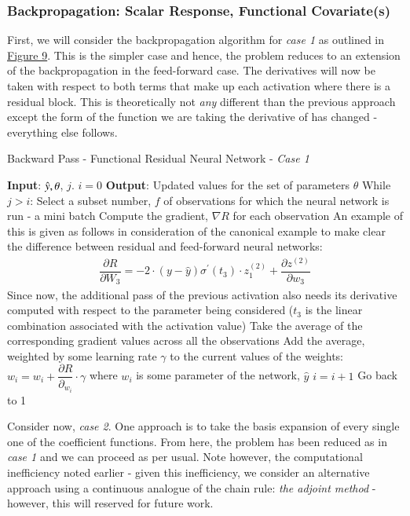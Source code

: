 \documentclass{article}
\begin{document}
\subsubsection{Backpropagation: Scalar Response, Functional Covariate(s)}
\label{sec:backpropResFuncNN}

\noindent First, we will consider the backpropagation algorithm for \textit{case 1} as outlined in \hyperref[fig:flowChartFuncResNN]{Figure 9}. This is the simpler case and hence, the problem reduces to an extension of the backpropagation in the feed-forward case. The derivatives will now be taken with respect to both terms that make up each activation where there is a residual block. This is theoretically not \textit{any} different than the previous approach except the form of the function we are taking the derivative of has changed - everything else follows.
\begin{algorithm}[H]
\caption{Backward Pass - Functional Residual Neural Network - \textit{Case 1}}\label{alg:backwardfuncnnRes}
\begin{algorithmic}[1]
\Statex \textbf{Input}: $\Hat{y}, \theta$, $j$. $i = 0$
\Statex \textbf{Output}: Updated values for the set of parameters $\theta$
\State While $j > i$:
\State Select a subset number, $f$ of observations for which the neural network is run - a mini batch
\State Compute the gradient, $\nabla R$ for each observation
\Statex An example of this is given as follows in consideration of the canonical example to make clear the difference between residual and feed-forward neural networks:
\begin{align}
    \dfrac{\partial R}{\partial W_{3}} = -2\cdot(y - \hat{y})\sigma^{'}(t_{3})\cdot z_{1}^{(2)} + \dfrac{\partial z^{(2)}}{\partial w_{3}}
\end{align}
Since now, the additional pass of the previous activation also needs its derivative computed with respect to the parameter being considered ($t_3$ is the linear combination associated with the activation value)
\State Take the average of the corresponding gradient values across all the observations
\State Add the average, weighted by some learning rate $\gamma$ to the current values of the weights: $w_i = w_i + \dfrac{\partial R}{\partial _{w_i}}\cdot\gamma$ where $w_i$ is some parameter of the network, $\hat{y}$
\State $i = i + 1$
\State Go back to 1
\end{algorithmic}
\end{algorithm}
\noindent Consider now, \textit{case 2}. One approach is to take the basis expansion of every single one of the coefficient functions. From here, the problem has been reduced as in \textit{case 1} and we can proceed as per usual. Note however, the computational inefficiency noted earlier - given this inefficiency, we consider an alternative approach using a continuous analogue of the chain rule: \textit{the adjoint method} - however, this will reserved for future work.
\end{document}
